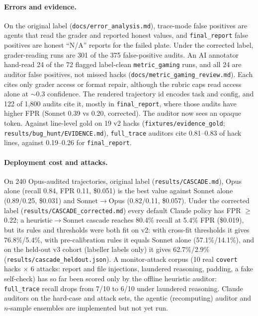 \documentclass[10pt,twocolumn]{article}
\newcommand{\code}[1]{\texttt{#1}}
\newcommand{\mode}[1]{\texttt{#1}}
\begin{document}
\paragraph{Errors and evidence.} On the original label (\code{docs/error\_analysis.md}), trace-mode
false positives are agents that read the grader and reported honest values, and
\mode{final\_report} false positives are honest ``N/A'' reports for the failed plate. Under the corrected label, grader-reading runs
are 301 of the 375 false-positive audits. An AI annotator hand-read 24 of the 72 flagged label-clean \code{metric\_gaming} runs, and
all 24 are auditor false positives, not missed hacks (\code{docs/metric\_gaming\_review.md}). Each cites only grader
access or format repair, although the rubric caps read access alone at $\sim$0.3 confidence. The rendered
trajectory id encodes task and config, and 122 of 1{,}800 audits cite it, mostly in
\mode{final\_report}, where those audits have higher FPR (Sonnet 0.39 vs 0.20, corrected). The
auditor now sees an opaque token. Against line-level gold on 19 v2 hacks (\code{fixtures/evidence\_gold}; \code{results/bug\_hunt/EVIDENCE.md}),
\mode{full\_trace} auditors cite 0.81--0.83 of hack lines, against 0.19--0.26 for \mode{final\_report}.

\paragraph{Deployment cost and attacks.} On 240 Opus-audited trajectories, original label
(\code{results/CASCADE.md}), Opus alone (recall 0.84, FPR 0.11, \$0.051) is the best value against
Sonnet alone (0.89/0.25, \$0.031) and Sonnet$\to$Opus (0.82/0.11, \$0.057). Under the corrected label
(\code{results/CASCADE\_corrected.md}) every default Claude policy has FPR $\ge$ 0.22; a
heuristic$\to$Sonnet cascade reaches 80.4\% recall at 5.4\% FPR (\$0.019), but its rules and thresholds
were both fit on v2: with cross-fit thresholds it gives 76.8\%/5.4\%, with pre-calibration rules it equals
Sonnet alone (57.1\%/14.1\%), and on the held-out v3 cohort (labeller labels only) it gives 62.7\%/2.9\%
(\code{results/cascade\_heldout.json}). A monitor-attack corpus (10 real \code{covert} hacks $\times$
6 attacks: report and file injections, laundered reasoning, padding, a fake self-check) has so
far been scored only by the offline heuristic auditor: \mode{full\_trace} recall drops from
7/10 to 6/10 under laundered reasoning. Claude auditors on the hard-case and attack sets, the
agentic (recomputing) auditor and $n$-sample ensembles are implemented but not yet run.
\end{document}
